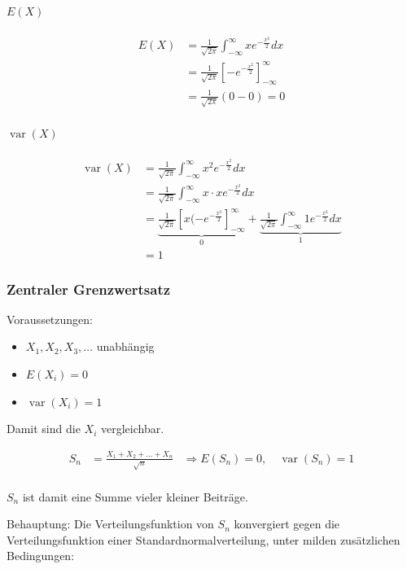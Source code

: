 \documentclass[10pt,a4paper]{scrartcl}
\newif\ifincludeDerivations
\DeclareMathOperator{\var}{var}
\begin{document}
\paragraph{$E(X)$}
\begin{align*}
  E(X) & = \frac{1}{\sqrt{2\pi}} \int_{-\infty}^\infty xe^{-\frac{x^2}{2}} dx \\
       & = \frac{1}{\sqrt{2\pi}} \left[ -e^{-\frac{x^2}{2}} \right]_{-\infty}^\infty \\
       & = \frac{1}{\sqrt{2\pi}} (0-0) = 0
\end{align*}

\paragraph{$\var(X)$}
\begin{align*}
  \var(X) & = \frac{1}{\sqrt{2\pi}} \int_{-\infty}^\infty x^2e^{-\frac{x^2}{2}} dx \\
          & = \frac{1}{\sqrt{2\pi}} \int_{-\infty}^\infty x\cdot xe^{-\frac{x^2}{2}} dx \\
          & = \underbrace{\frac{1}{\sqrt{2\pi}} \left[ x(-e^{-\frac{x^2}{2}} \right]_{-\infty}^\infty}_{0} + 
              \underbrace{\frac{1}{\sqrt{2\pi}} \int_{-\infty}^\infty 1 e^{-\frac{x^2}{2}} dx}_{1} \\
          & = 1
\end{align*}

\subsubsection{Zentraler Grenzwertsatz}


\ifincludeDerivations
Voraussetzungen:
\begin{itemize}
\item $X_1, X_2, X_3, \dots$ unabhängig
\item $E(X_i) = 0$ 
\item $\var(X_i) = 1$
\end{itemize}

Damit sind die $X_i$ vergleichbar.

\begin{align*}
    S_n & = \frac{X_1 + X_2 + \dots + X_n}{\sqrt{n}} &\Rightarrow E(S_n) = 0,\quad \var(S_n) = 1 \\
\end{align*}

$S_n$ ist damit eine Summe vieler kleiner Beiträge.

Behauptung: Die Verteilungsfunktion von $S_n$ konvergiert gegen die Verteilungsfunktion einer Standardnormalverteilung, unter milden zusätzlichen Bedingungen:
\end{document}
